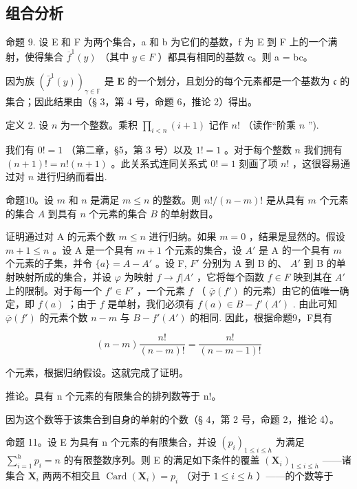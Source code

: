 \subsection{组合分析}

命题 9. 设 E 和 F 为两个集合，a 和 b 为它们的基数，f 为 E 到 F 上的一个满射，使得集合 \(\overline{f}^{1}(y)\) （其中 \(y \in F\) ）都具有相同的基数 c。则 a = bc。

因为族 \((\bar{f}^1 (y))_{\gamma \in \mathbb{F}}\) 是 \(\mathbf{E}\) 的一个划分，且划分的每个元素都是一个基数为 \(\mathfrak{c}\) 的集合；因此结果由（§ 3，第 4 号，命题 6，推论 2）得出。

定义 2. 设 \(n\) 为一个整数。乘积 \(\prod_{i < n} (i + 1)\) 记作 \(n!\) （读作“阶乘 \(n\) '').

我们有 \(0! = 1\) （第二章，§5，第 3 号）以及 \(1! = 1\) 。对于每个整数 \(n\) 我们拥有 \((n + 1)! = n!(n + 1)\) 。此关系式连同关系式 \(0! = 1\) 刻画了项 \(n!\) ，这很容易通过对 \(n\) 进行归纳而看出.

命题10。设 \(m\) 和 \(n\) 是满足 \(m \leqslant n\) 的整数。则 \(n! / (n - m)!\) 是从具有 \(m\) 个元素的集合 \(A\) 到具有 \(n\) 个元素的集合 \(B\) 的单射数目。

证明通过对 A 的元素个数 \(m \leqslant n\) 进行归纳。如果 \(m = 0\) ，结果是显然的。假设 \(m + 1 \leqslant n\) 。设 A 是一个具有 \(m + 1\) 个元素的集合，设 \(A'\) 是 A 的一个具有 \(m\) 个元素的子集，并令 \(\{a\} = A - A'\) 。设 F, \(F'\) 分别为 A 到 B 的、 \(A'\) 到 B 的单射映射所成的集合，并设 \(\varphi\) 为映射 \(f \to f|A'\) ，它将每个函数 \(f \in F\) 映到其在 \(A'\) 上的限制。对于每一个 \(f' \in F'\) ，一个元素 \(f\) （ \(\overline{\varphi}(f')\) 的元素）由它的值唯一确定，即 \(f(a)\) ；由于 \(f\) 是单射，我们必须有 \(f(a) \in B - f'(A')\) . 由此可知 \(\overline{\varphi}(f')\) 的元素个数 \(n - m\) 与 \(B - f'(A')\) 的相同. 因此，根据命题9，F具有

\[
(n - m) \frac {n !}{(n - m) !} = \frac {n !}{(n - m - 1) !}
\]

个元素，根据归纳假设。这就完成了证明。

推论。具有 n 个元素的有限集合的排列数等于 n!。

因为这个数等于该集合到自身的单射的个数（§ 4，第 2 号，命题 2，推论 4）。

命题 11。设 E 为具有 n 个元素的有限集合，并设 \((p_i)_{1 \leqslant i \leqslant h}\) 为满足 \(\sum_{i=1}^{h} p_i = n\) 的有限整数序列。则 E 的满足如下条件的覆盖 \((\mathbf{X}_i)_{1 \leqslant i \leqslant h}\) ——诸集合 \(\mathbf{X}_i\) 两两不相交且 \(\operatorname{Card}(\mathbf{X}_i) = p_i\) （对于 \(1 \leqslant i \leqslant h\) ）——的个数等于

